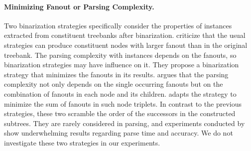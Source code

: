\documentclass[../../document.tex]{subfiles}
\begin{document}
    \paragraph{Minimizing Fanout or Parsing Complexity.}
    Two binarization strategies specifically consider the properties of  instances extracted from constituent treebanks after binarization.
     criticize that the usual strategies can produce constituent nodes with larger fanout than in the original treebank.
    The parsing complexity with  instances depends on the fanouts, so binarization strategies may have influence on it.
    They propose a binarization strategy that minimizes the fanouts in its results.
     argues that the parsing complexity not only depends on the single occurring fanouts but on the combination of fanouts in each node and its children.
     adapts the strategy to minimize the sum of fanouts in such node triplets.
    In contrast to the previous strategies, these two scramble the order of the successors in the constructed subtrees.
    They are rarely considered in parsing, and experiments conducted by \citet{Cra12} show underwhelming results regarding parse time and accuracy.
    We do not investigate these two strategies in our experiments.
\end{document}
